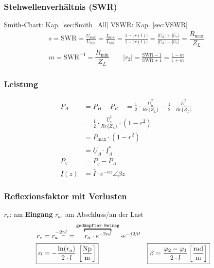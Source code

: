 \subsubsection{Stehwellenverhältnis (SWR)}
Smith-Chart: Kap. \ref{sec:Smith_All} \qquad VSWR: Kap. \ref{sec:VSWR}
\begin{align*}
	&s = \mathrm{SWR}       = \frac{U_\text{max}}{U_\text{min}} = \frac{I_\text{max}}{I_\text{min}} = \frac{1+|r(l)|}{1-|r(l)|} = \frac{|U_h|+|U_r|}{|U_h|-|U_r|}= \dfrac{R_{\text{max}}}{Z_L}&                                                        \\
	&m = \mathrm{SWR}^{-1} = \dfrac{R_{\text{min}}}{Z_L} \qquad |r_2| = \frac{\text{SWR}-1}{\text{SWR}+1} = \frac{1-m}{1+m} &
\end{align*}

\subsubsection{Leistung}
\begin{align*}
	P_{A}            & = P_{H}-P_{R}                                                                                                
	\quad = \frac{1}{2} \cdot \frac{\hat{U}_{h}^{2}}{Re\{Z_{L}\}}-\frac{1}{2} \cdot \frac{\hat{U}_{r}^{2}}{Re\{Z_{L}\}} \\
	& =\frac{1}{2} \cdot \frac{\hat{U}_{h}^{2}}{Re\{Z_{L}\}} \cdot\left(1-r^{2}\right)                              \\
	& = P_{\max} \cdot\left(1-r^{2}\right)                                                                          \\
	& = \underline{U}_A\cdot\underline{I}_A^*                                                                       \\
	P_V              & = P_q -P_A                                                                                                    \\
	\underline{I}(z) & = \hat{I}\cdot e^{-\alpha z}\angle \beta z
\end{align*}

\subsubsection{Reflexionsfaktor mit Verlusten}
$ r_e $: am \textbf{Eingang} \qquad $ r_a $: am Abschluss/an der Last
\begin{align*}
    r_e    & = r_a  ^{-2\underline{\gamma} l} =  \overbracket{r_a \cdot e^{-2\alpha l}}^ \texttt{gedämpfter Betrag}   \cdot e^{-j2\beta l}                                                     \\
    \Aboxed{\alpha & = -\frac{\ln(r_a)}{2 \cdot l} \, \left[ \frac{\si{Np}}{\si{m}} \right]  }& \Aboxed{\beta & = \dfrac{\varphi_2 -\varphi_1}{2\cdot l} \left[ \frac{\si{rad}}{\si{m}} \right] }
\end{align*}


